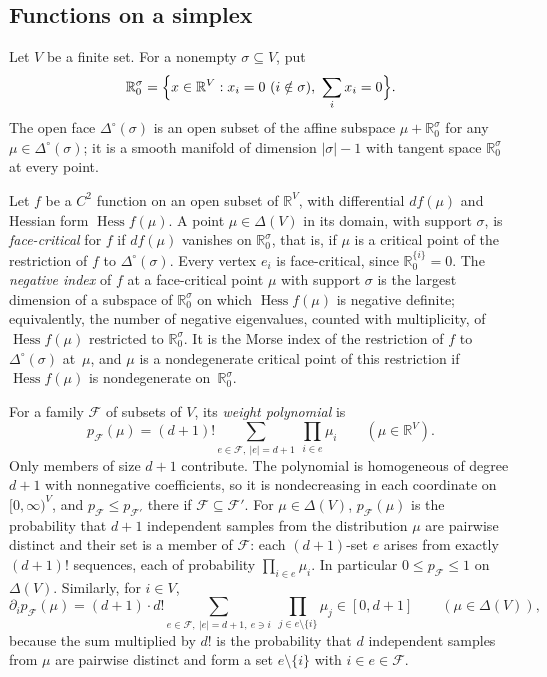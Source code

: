 \documentclass[11pt]{article}
\theoremstyle{definition}
\numberwithin{equation}{section}
\newcommand{\R}{\mathbb R}
\DeclareMathOperator{\Hess}{Hess}
\begin{document}
\subsection{Functions on a simplex}\label{sec:calculus}

Let $V$ be a finite set. For a nonempty $\sigma\subseteq V$, put
\begin{equation*}
 \R^\sigma_0=\Bigl\{x\in\R^V:x_i=0\ (i\notin\sigma),\ \sum_ix_i=0\Bigr\}.
\end{equation*}
The open face $\Delta^\circ(\sigma)$ is an open subset of the affine subspace $\mu+\R^\sigma_0$ for any $\mu\in\Delta^\circ(\sigma)$; it is a smooth manifold of dimension $|\sigma|-1$ with tangent space $\R^\sigma_0$ at every point.

Let $f$ be a $C^2$ function on an open subset of $\R^V$, with differential $df(\mu)$ and Hessian form $\Hess f(\mu)$. A point $\mu\in\Delta(V)$ in its domain, with support $\sigma$, is \emph{face-critical} for $f$ if $df(\mu)$ vanishes on $\R^\sigma_0$, that is, if $\mu$ is a critical point of the restriction of $f$ to $\Delta^\circ(\sigma)$. Every vertex $e_i$ is face-critical, since $\R^{\{i\}}_0=0$. The \emph{negative index} of $f$ at a face-critical point $\mu$ with support $\sigma$ is the largest dimension of a subspace of $\R^\sigma_0$ on which $\Hess f(\mu)$ is negative definite; equivalently, the number of negative eigenvalues, counted with multiplicity, of $\Hess f(\mu)$ restricted to $\R^\sigma_0$. It is the Morse index of the restriction of $f$ to $\Delta^\circ(\sigma)$ at~$\mu$, and $\mu$ is a nondegenerate critical point of this restriction if $\Hess f(\mu)$ is nondegenerate on~$\R^\sigma_0$.

For a family $\mathcal F$ of subsets of $V$, its \emph{weight polynomial} is
\begin{equation}\label{eq:polynomial}
 p_{\mathcal F}(\mu)=(d+1)!\sum_{e\in\mathcal F,\ |e|=d+1}\ \prod_{i\in e}\mu_i\qquad(\mu\in\R^V).
\end{equation}
Only members of size $d+1$ contribute. The polynomial is homogeneous of degree $d+1$ with nonnegative coefficients, so it is nondecreasing in each coordinate on $[0,\infty)^V$, and $p_{\mathcal F}\le p_{\mathcal F'}$ there if $\mathcal F\subseteq\mathcal F'$. For $\mu\in\Delta(V)$, $p_{\mathcal F}(\mu)$ is the probability that $d+1$ independent samples from the distribution $\mu$ are pairwise distinct and their set is a member of $\mathcal F$: each $(d+1)$-set $e$ arises from exactly $(d+1)!$ sequences, each of probability $\prod_{i\in e}\mu_i$. In particular $0\le p_{\mathcal F}\le1$ on $\Delta(V)$. Similarly, for $i\in V$,
\begin{equation}\label{eq:derivbound}
 \partial_ip_{\mathcal F}(\mu)=(d+1)\cdot d!\sum_{e\in\mathcal F,\ |e|=d+1,\ e\ni i}\ \prod_{j\in e\setminus\{i\}}\mu_j\in[0,d+1]\qquad(\mu\in\Delta(V)),
\end{equation}
because the sum multiplied by $d!$ is the probability that $d$ independent samples from $\mu$ are pairwise distinct and form a set $e\setminus\{i\}$ with $i\in e\in\mathcal F$.
\end{document}
